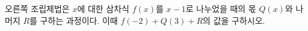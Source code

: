 \noindent\begin{minipage}[t]{0.5\linewidth}\vspace{0pt}\raggedright 오른쪽 조립제법은 $x$에 대한 삼차식 $f(x)$를 $x-1$로 나누었을 때의 몫 $Q(x)$와 나머지 $R$를 구하는 과정이다. 이때 $f(-2)+Q(3)+R$의 값을 구하시오.\end{minipage}\hfill\begin{minipage}[t]{0.47\linewidth}\vspace{0pt}\end{minipage}
